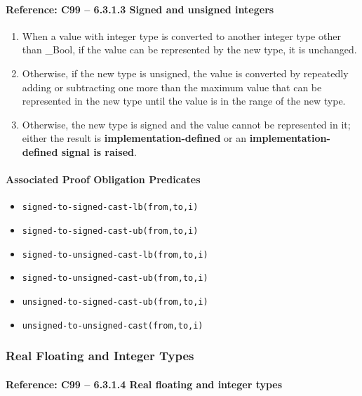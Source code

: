 \documentclass[11pt]{article}
\begin{document}
\paragraph{Reference: C99 -- 6.3.1.3 Signed and unsigned integers}
\begin{enumerate}
\item When a value with integer type is converted to another integer type other than \_Bool, 
if the value can be represented by the new type, it is unchanged.
\item Otherwise, if the new type is unsigned, the value is converted by repeatedly 
adding or subtracting one more than the maximum value that can be represented in the 
new type until the value is in the range of the new type.
\item  Otherwise, the new type is signed and the value cannot be represented in it; 
either the result is {\bf implementation-defined} or an 
{\bf implementation-defined signal is raised}.
\end{enumerate}

\paragraph{Associated Proof Obligation Predicates}
\begin{itemize}
\item {\tt signed-to-signed-cast-lb(from,to,i)}
\item {\tt signed-to-signed-cast-ub(from,to,i)}
\item {\tt signed-to-unsigned-cast-lb(from,to,i)}
\item {\tt signed-to-unsigned-cast-ub(from,to,i)}
\item {\tt unsigned-to-signed-cast-ub(from,to,i)}
\item {\tt unsigned-to-unsigned-cast(from,to,i)}
\end{itemize}

\subsubsection{Real Floating and Integer Types}

\paragraph{Reference: C99 -- 6.3.1.4 Real floating and integer types}
\end{document}
